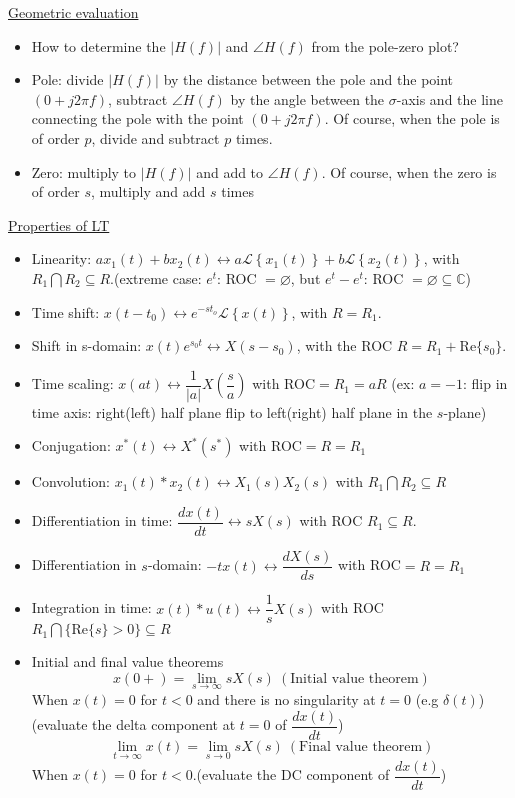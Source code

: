 \documentclass{article}
\newcommand{\lt}[1]{\mathcal{L}\left\{#1\right\}}
\begin{document}
\underline{Geometric evaluation}

\begin{itemize}
    \item How to determine the $|H(f)|$ and $\angle H(f)$ from the pole-zero plot?
    \item Pole: divide $|H(f)|$ by the distance between the pole and the point $(0+j2\pi f)$, subtract $\angle H(f)$ by the angle between the $\sigma$-axis and the line connecting the pole with the point $(0+j2\pi f)$. Of course, when the pole is of order $p$, divide and subtract $p$ times.
    \item Zero: multiply to $|H(f)|$ and add to $\angle H(f)$. Of course, when the zero is of order $s$, multiply and add $s$ times
\end{itemize}

\underline{Properties of LT}
\begin{itemize}
    \item Linearity: $ax_1(t)+bx_2(t)\leftrightarrow a\lt{x_1(t)}+b\lt{x_2(t)}$, with $R_1\bigcap R_2 \subseteq R$.(extreme case: $e^t$: ROC $=\varnothing$, but $e^t-e^t$: ROC $=\varnothing\subseteq\mathbb{C}$)
    \item Time shift: $x(t-t_0)\leftrightarrow e^{-st_o}\lt{x(t)}$, with $R=R_1$.
    \item Shift in s-domain: $x(t)e^{s_0t}\leftrightarrow X(s-s_0)$, with the ROC $R=R_1+\mathrm{Re}\{s_0\}$.
    \item Time scaling: $x(at)\leftrightarrow \dfrac{1}{|a|}X\left(\dfrac{s}{a}\right)$ with ROC$=R_1=aR$ (ex: $a=-1$: flip in time axis: right(left) half plane flip to left(right) half plane in the $s$-plane)
    \item Conjugation: $x^*(t)\leftrightarrow X^*(s^*)$ with ROC$=R=R_1$
    \item Convolution: $x_1(t)*x_2(t)\leftrightarrow X_1(s)X_2(s)$ with $R_1\bigcap R_2\subseteq R$
    \item Differentiation in time: $\dfrac{dx(t)}{dt}\leftrightarrow sX(s)$ with ROC $R_1\subseteq R$.
    \item Differentiation in $s$-domain: $-tx(t)\leftrightarrow \dfrac{dX(s)}{ds}$ with ROC$=R=R_1$
    \item Integration in time:
    $x(t)*u(t)\leftrightarrow \dfrac{1}{s}X(s)$ with ROC $R_1\bigcap \{\mathrm{Re}\{s\}>0\}\subseteq R$
    \item Initial and final value theorems
    \[x(0+)=\lim_{s\rightarrow\infty}sX(s)\:(\text{Initial value theorem})\]
    When $x(t)=0$ for $t < 0$ and there is no singularity at $t=0$ (e.g $\delta(t)$) (evaluate the delta component at $t=0$ of $\dfrac{dx(t)}{dt}$)
    \[\lim_{t\rightarrow\infty}x(t)=\lim_{s\rightarrow 0}sX(s)\:(\text{Final value theorem})\]
    When $x(t)=0$ for $t < 0$.(evaluate the DC component of $\dfrac{dx(t)}{dt}$)
\end{itemize}
\end{document}
